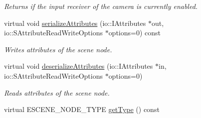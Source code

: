 \begin{DoxyCompactItemize}
\begin{DoxyCompactList}\small\item\em Returns if the input receiver of the camera is currently enabled. \end{DoxyCompactList}\item 
\hypertarget{classirr_1_1scene_1_1_c_camera_scene_node_a6f52cc9f603b1d576c32c13d992366bc}{virtual void \hyperlink{classirr_1_1scene_1_1_c_camera_scene_node_a6f52cc9f603b1d576c32c13d992366bc}{serialize\-Attributes} (io\-::\-I\-Attributes $\ast$out, io\-::\-S\-Attribute\-Read\-Write\-Options $\ast$options=0) const }\label{classirr_1_1scene_1_1_c_camera_scene_node_a6f52cc9f603b1d576c32c13d992366bc}

\begin{DoxyCompactList}\small\item\em Writes attributes of the scene node. \end{DoxyCompactList}\item 
\hypertarget{classirr_1_1scene_1_1_c_camera_scene_node_a48b7c015411a0afff6878abf875e9d14}{virtual void \hyperlink{classirr_1_1scene_1_1_c_camera_scene_node_a48b7c015411a0afff6878abf875e9d14}{deserialize\-Attributes} (io\-::\-I\-Attributes $\ast$in, io\-::\-S\-Attribute\-Read\-Write\-Options $\ast$options=0)}\label{classirr_1_1scene_1_1_c_camera_scene_node_a48b7c015411a0afff6878abf875e9d14}

\begin{DoxyCompactList}\small\item\em Reads attributes of the scene node. \end{DoxyCompactList}\item 
\hypertarget{classirr_1_1scene_1_1_c_camera_scene_node_a81595772f903d74b90f8310dec5d741e}{virtual E\-S\-C\-E\-N\-E\-\_\-\-N\-O\-D\-E\-\_\-\-T\-Y\-P\-E \hyperlink{classirr_1_1scene_1_1_c_camera_scene_node_a81595772f903d74b90f8310dec5d741e}{get\-Type} () const }\label{classirr_1_1scene_1_1_c_camera_scene_node_a81595772f903d74b90f8310dec5d741e}


\end{DoxyCompactItemize}
